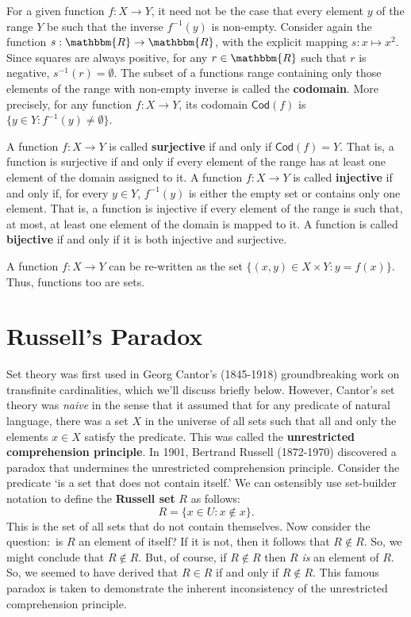 \documentclass[11pt]{article}
\theoremstyle{definition}
\theoremstyle{remark}
\begin{document}
For a given function $f:X\rightarrow Y$, it need not be the case that every element $y$ of the range $Y$ be such that the inverse $f^{-1}(y)$ is non-empty. Consider again the function $s:\mathbbm{R}\rightarrow\mathbbm{R}$, with the explicit mapping $s:x\mapsto x^{2}$. Since squares are always positive, for any $r\in\mathbbm{R}$ such that $r$ is negative, $s^{-1}(r)=\emptyset$. The subset of a functions range containing only those elements of the range with non-empty inverse is called the \textbf{codomain}. More precisely, for any function $f:X\rightarrow Y$, its codomain $\textsf{Cod}(f)$ is
$\{y\in Y:f^{-1}(y)\neq\emptyset\}$.\par 


A function $f:X\rightarrow Y$ is called \textbf{surjective} if and only if $\textsf{Cod}(f)=Y$. That is, a function is surjective if and only if every element of the range has at least one element of the domain assigned to it. A function $f:X\rightarrow Y$ is called \textbf{injective} if and only if, for every $y\in Y$, $f^{-1}(y)$ is either the empty set or contains only one element. That is, a function is injective if every element of the range is such that, at most, at least one element of the domain is mapped to it. A function is called \textbf{bijective} if and only if it is both injective and surjective.\par 

A function $f:X\rightarrow Y$ can be re-written as the set $\{(x,y)\in X\times Y : y=f(x)\}$. Thus, functions too are sets.\par 

\section{Russell's Paradox}
Set theory was first used in Georg Cantor's (1845-1918) groundbreaking work on transfinite cardinalities, which we'll discuss briefly below. However, Cantor's set theory was \textit{naive} in the sense that it assumed that for any predicate of natural language, there was a set $X$ in the universe of all sets such that all and only the elements $x\in X$ satisfy the predicate. This was called the \textbf{unrestricted comprehension principle}. In 1901, Bertrand Russell (1872-1970) discovered a paradox that undermines the unrestricted comprehension principle. Consider the predicate `is a set that does not contain itself.' We can ostensibly use set-builder notation to define the \textbf{Russell set} $R$ as follows:
$$R=\{x\in U:x\not\in x\}.$$
This is the set of all sets that do not contain themselves. Now consider the question:\ is $R$ an element of itself? If it is not, then it follows that $R\not\in R$. So, we might conclude that $R\not\in R$. But, of course, if $R\not\in R$ then $R$ \textit{is} an element of $R$. So, we seemed to have derived that $R\in R$ if and only if $R\not\in R$. This famous paradox is taken to demonstrate the inherent inconsistency of the unrestricted comprehension principle.\par 
\end{document}
